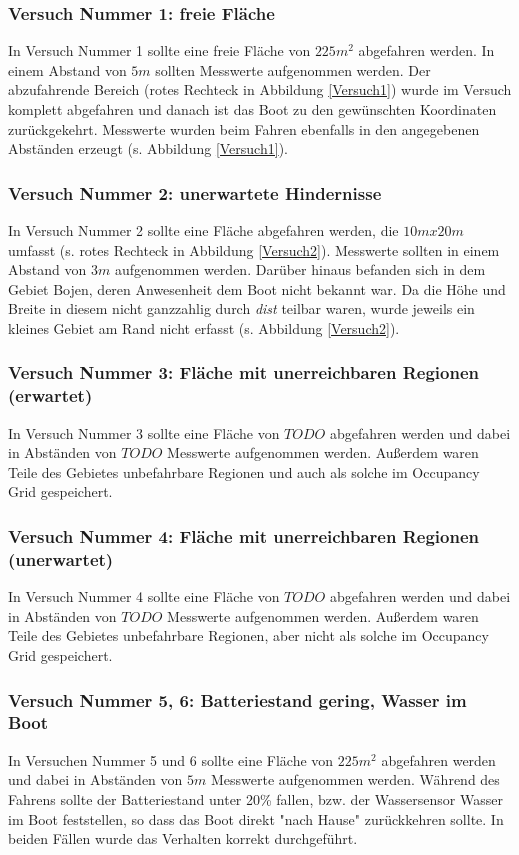 \documentclass[11pt]{article}
\begin{document}
\subsubsection{Versuch Nummer 1: freie Fläche}
In Versuch Nummer 1 sollte eine freie Fläche von $225m^2$ abgefahren werden. In einem Abstand von $5m$ sollten Messwerte aufgenommen werden. Der abzufahrende Bereich (rotes Rechteck in Abbildung \ref{Versuch1}) wurde im Versuch komplett abgefahren und danach ist das Boot zu den gewünschten Koordinaten zurückgekehrt. Messwerte wurden beim Fahren ebenfalls in den angegebenen Abständen erzeugt (s. Abbildung \ref{Versuch1}).

\subsubsection{Versuch Nummer 2: unerwartete Hindernisse}
In Versuch Nummer 2 sollte eine Fläche abgefahren werden, die $10mx20m$ umfasst (s. rotes Rechteck in Abbildung \ref{Versuch2}). Messwerte sollten in einem Abstand von $3m$ aufgenommen werden. Darüber hinaus befanden sich in dem Gebiet Bojen, deren Anwesenheit dem Boot nicht bekannt war. Da die Höhe und Breite in diesem nicht ganzzahlig durch \textit{dist} teilbar waren, wurde jeweils ein kleines Gebiet am Rand nicht erfasst (s. Abbildung \ref{Versuch2}).

\subsubsection{Versuch Nummer 3: Fläche mit unerreichbaren Regionen (erwartet)}
In Versuch Nummer 3 sollte eine Fläche von $TODO$ abgefahren werden und dabei in Abständen von $TODO$ Messwerte aufgenommen werden. Außerdem waren Teile des Gebietes unbefahrbare Regionen und auch als solche im Occupancy Grid gespeichert.

\subsubsection{Versuch Nummer 4: Fläche mit unerreichbaren Regionen (unerwartet)}
In Versuch Nummer 4 sollte eine Fläche von $TODO$ abgefahren werden und dabei in Abständen von $TODO$ Messwerte aufgenommen werden. Außerdem waren Teile des Gebietes unbefahrbare Regionen, aber nicht als solche im Occupancy Grid gespeichert.

\subsubsection{Versuch Nummer 5, 6: Batteriestand gering, Wasser im Boot}
In Versuchen Nummer 5 und 6 sollte eine Fläche von $225m^2$ abgefahren werden und dabei in Abständen von $5m$ Messwerte aufgenommen werden. Während des Fahrens sollte der Batteriestand unter 20\% fallen, bzw. der Wassersensor Wasser im Boot feststellen, so dass das Boot direkt "nach Hause" zurückkehren sollte. In beiden Fällen wurde das Verhalten korrekt durchgeführt.\\
\end{document}
